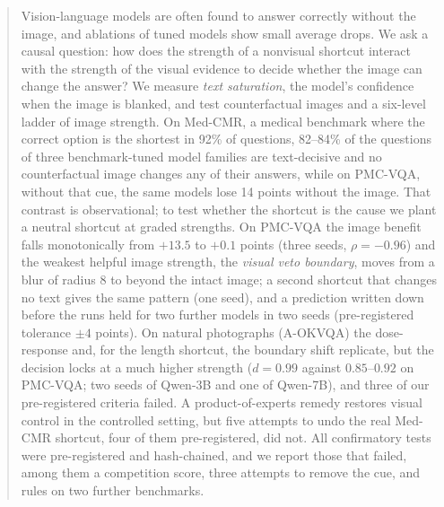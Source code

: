 \begin{abstract}
Vision-language models are often found to answer correctly without the image, and ablations of tuned models show small average drops.
We ask a causal question: how does the strength of a nonvisual shortcut interact with the strength of the visual evidence to decide whether the image can change the answer?
We measure \emph{text saturation}, the model's confidence when the image is blanked, and test counterfactual images and a six-level ladder of image strength.
On Med-CMR, a medical benchmark where the correct option is the shortest in 92\% of questions, 82--84\% of the questions of three benchmark-tuned model families are text-decisive and no counterfactual image changes any of their answers, while on PMC-VQA, without that cue, the same models lose 14 points without the image.
That contrast is observational; to test whether the shortcut is the cause we plant a neutral shortcut at graded strengths.
On PMC-VQA the image benefit falls monotonically from $+13.5$ to $+0.1$ points (three seeds, $\rho=-0.96$) and the weakest helpful image strength, the \emph{visual veto boundary}, moves from a blur of radius 8 to beyond the intact image; a second shortcut that changes no text gives the same pattern (one seed), and a prediction written down before the runs held for two further models in two seeds (pre-registered tolerance $\pm4$ points).
On natural photographs (A-OKVQA) the dose-response and, for the length shortcut, the boundary shift replicate, but the decision locks at a much higher strength ($d=0.99$ against $0.85$--$0.92$ on PMC-VQA; two seeds of Qwen-3B and one of Qwen-7B), and three of our pre-registered criteria failed.
A product-of-experts remedy restores visual control in the controlled setting, but five attempts to undo the real Med-CMR shortcut, four of them pre-registered, did not.
All confirmatory tests were pre-registered and hash-chained, and we report those that failed, among them a competition score, three attempts to remove the cue, and rules on two further benchmarks.
\end{abstract}
